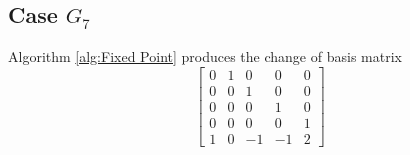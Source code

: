 \documentclass{article}
\theoremstyle{plain}
\theoremstyle{definition}
\newcommand{\tand}{\ensuremath{\,\,\, \text{and} \,\,\,}}
\begin{document}
\subsection{Case $G_7$}
%
Algorithm \ref{alg:Fixed Point} produces the change of basis matrix 
$$
\left[ \begin {array}{ccccc} 0&1&0&0&0\\ 0&0&1&0&0
\\ 0&0&0&1&0\\ 0&0&0&0&1
\\ 1&0&-1&-1&2\end {array} \right] 
$$
\end{document}
